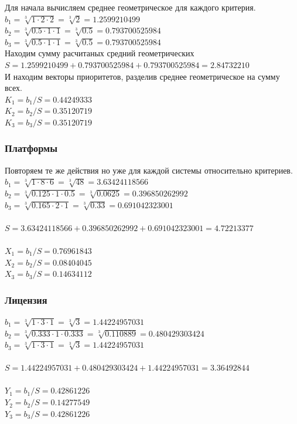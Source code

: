 \documentclass[a4paper,12pt]{report} %
\begin{document}
Для начала вычисляем среднее геометрическое для каждого критерия.
$ b_1=\sqrt[3]{1 \cdot 2 \cdot 2} = \sqrt[3]{2} = 1.2599210499 $ \\
$ b_2=\sqrt[3]{0.5 \cdot 1 \cdot 1} = \sqrt[3]{0.5} = 0.793700525984 $ \\
$ b_3=\sqrt[3]{0.5 \cdot 1 \cdot 1} = \sqrt[3]{0.5} = 0.793700525984 $ \\

Находим сумму расчитаных средний геометрических
\\
$ S = 1.2599210499 + 0.793700525984 + 0.793700525984 = 2.84732210 $ \\

И находим векторы приоритетов, разделив среднее геометрическое на сумму всех.
\\
$K_1 = b_1/S = 0.44249333 $ \\
$K_2 = b_2/S = 0.35120719 $ \\
$K_3 = b_3/S = 0.35120719 $ \\

\subsubsection{Платформы}

Повторяем те же действия но уже для каждой системы относительно критериев.
$ b_1=\sqrt[3]{1 \cdot 8 \cdot 6} = \sqrt[3]{48} = 3.63424118566 $ \\
$ b_2=\sqrt[3]{0.125 \cdot 1 \cdot 0.5} = \sqrt[3]{0.0625} = 0.396850262992 $ \\
$ b_3=\sqrt[3]{0.165 \cdot 2 \cdot 1} = \sqrt[3]{0.33} = 0.691042323001 $ \\
\\
$ S = 3.63424118566 + 0.396850262992 + 0.691042323001 = 4.72213377 $ \\
\\
$ X_1 = b_1/S = 0.76961843 $ \\
$ X_2 = b_2/S = 0.08404045 $ \\
$ X_3 = b_3/S = 0.14634112 $ \\

\subsubsection{Лицензия}

$ b_1=\sqrt[3]{1 \cdot 3 \cdot 1} = \sqrt[3]{3} = 1.44224957031 $ \\
$ b_2=\sqrt[3]{0.333 \cdot 1 \cdot 0.333} = \sqrt[3]{0.110889} = 0.480429303424
$ \\
$ b_3=\sqrt[3]{1 \cdot 3 \cdot 1} = \sqrt[3]{3} = 1.44224957031 $ \\
\\
$ S = 1.44224957031 + 0.480429303424 + 1.44224957031 = 3.36492844 $ \\
\\
$ Y_1 = b_1/S = 0.42861226 $ \\
$ Y_2 = b_2/S = 0.14277549 $ \\
$ Y_3 = b_3/S = 0.42861226 $ \\
\end{document}
